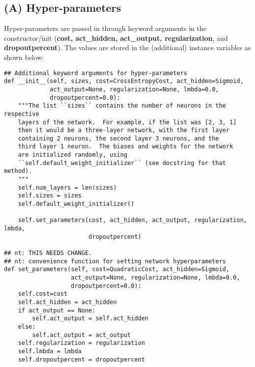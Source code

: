 \documentclass[11pt]{article}
\begin{document}
\subsection*{(A) Hyper-parameters}
\label{sec:org7b2a97a}
Hyper-parameters are passed in through keyword arguments in the constructor/init (\textbf{cost, act\_hidden, act\_output, regularization}, and \textbf{dropoutpercent}). The values are stored in the (additional) instance variables as shown below:
\begin{verbatim}
## Additional keyword arguments for hyper-parameters
def __init__(self, sizes, cost=CrossEntropyCost, act_hidden=Sigmoid,
             act_output=None, regularization=None, lmbda=0.0,
             dropoutpercent=0.0):
    """The list ``sizes`` contains the number of neurons in the respective
    layers of the network.  For example, if the list was [2, 3, 1]
    then it would be a three-layer network, with the first layer
    containing 2 neurons, the second layer 3 neurons, and the
    third layer 1 neuron.  The biases and weights for the network
    are initialized randomly, using
    ``self.default_weight_initializer`` (see docstring for that method).
    """
    self.num_layers = len(sizes)
    self.sizes = sizes
    self.default_weight_initializer()

    self.set_parameters(cost, act_hidden, act_output, regularization, lmbda,
                        dropoutpercent)

## nt: THIS NEEDS CHANGE.
## nt: convenience function for setting network hyperparameters
def set_parameters(self, cost=QuadraticCost, act_hidden=Sigmoid,
                   act_output=None, regularization=None, lmbda=0.0,
                   dropoutpercent=0.0):
    self.cost=cost
    self.act_hidden = act_hidden
    if act_output == None:
        self.act_output = self.act_hidden
    else:
        self.act_output = act_output
    self.regularization = regularization
    self.lmbda = lmbda
    self.dropoutpercent = dropoutpercent
\end{verbatim}
\end{document}
